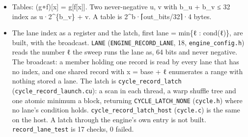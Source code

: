 \begin{itemize}
\begin{itemize}
\item key = P(δ), δ the impulse. For linear shift-invariant P, P(x) = key ∗ x.
\item w·x = Σ over the set bits b of w of x ≪ b.
\item With lanes wide enough that none carries, A·K holds the smoothed lanes, and K = K\_\allowbreak{}z·K\_\allowbreak{}y·K\_\allowbreak{}x.
\item A lane below 2\textasciicircum{}m under a row of sum S stays below 2\textasciicircum{}\{m + bitlen(S − 1)\}.
\item The CRC-64 key: the advance over 2\textasciicircum{}k zero bytes is A\textasciicircum{}\{2\textasciicircum{}k\}, 48 matrices (24,576 bytes), and crc(a ⊕ b) = crc(a) ⊕ crc(b) ⊕ crc(0).
\item The mirror fold repeats with period 2N: one period is positioned as a table of offsets.
\end{itemize}
\item Tables: (g∘f)[x] = g[f[x]]. Two never-negative u, v with b\_\allowbreak{}u + b\_\allowbreak{}v ≤ 32 index as u·2\textasciicircum{}\{b\_\allowbreak{}v\} + v. A table is 2\textasciicircum{}b·⌈out\_\allowbreak{}bits/32⌉·4 bytes.
\item The lane index as a register and the latch, first lane = min\{ℓ : cond(ℓ)\}, are built, with the broadcast. \texttt{LANE} (\texttt{ENGINE\_\allowbreak{}RECORD\_\allowbreak{}LANE}, 18, \texttt{engine\_\allowbreak{}config.\allowbreak{}h}) reads the number ℓ the sweep runs the lane as, 64 bits and never negative. The broadcast: a member holding one record is read by every lane that has no index, and one shared record with x = base + ℓ enumerates a range with nothing stored a lane. The latch is \texttt{cycle\_\allowbreak{}record\_\allowbreak{}latch} (\texttt{cycle\_\allowbreak{}record\_\allowbreak{}launch.\allowbreak{}cu}): a scan in each thread, a warp shuffle tree and one atomic minimum a block, returning \texttt{CYCLE\_\allowbreak{}LATCH\_\allowbreak{}NONE} (\texttt{cycle.\allowbreak{}h}) where no lane's condition holds. \texttt{cycle\_\allowbreak{}record\_\allowbreak{}latch\_\allowbreak{}host} (\texttt{cycle.\allowbreak{}c}) is the same on the host. A latch through the engine's own entry is not built. \texttt{record\_\allowbreak{}lane\_\allowbreak{}test} is 17 checks, 0 failed.

\end{itemize}

